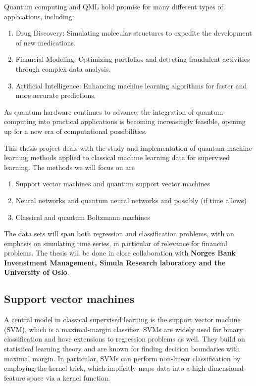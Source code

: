 \documentclass[%
oneside,                 %
final,                   %
10pt]{article}
\begin{document}
Quantum computing and QML hold promise for many different types of  applications, including:

\begin{enumerate}
\item Drug Discovery: Simulating molecular structures to expedite the development of new medications.

\item Financial Modeling: Optimizing portfolios and detecting fraudulent activities through complex data analysis.

\item Artificial Intelligence: Enhancing machine learning algorithms for faster and more accurate predictions. 
\end{enumerate}

As quantum hardware continues to advance, the integration of quantum
computing into practical applications is becoming increasingly
feasible, opening up for a new era of computational possibilities.

This thesis project deals with the study and implementation of quantum
machine learning methods applied to classical machine learning data
for supervised learning.  The methods we will focus on are

\begin{enumerate}
\item Support vector machines and quantum support vector machines

\item Neural networks and quantum neural networks and possibly (if time allows)

\item Classical and quantum Boltzmann machines
\end{enumerate}


The data sets will span both regression and classification problems,
with an emphasis on simulating time series, in particular of relevance
for financial problems. The thesis will be done in close collaboration
with \textbf{Norges Bank Invenstment Management, Simula Research
  laboratory and the University of Oslo}.

\subsection*{Support vector machines}

A central model in classical supervised learning is the support vector
machine (SVM), which is a maximal-margin classifier.  SVMs are widely
used for binary classification and have extensions to regression
problems as well.  They build on statistical learning theory and are
known for finding decision boundaries with maximal margin.  In
particular, SVMs can perform non-linear classification by employing
the kernel trick, which implicitly maps data into a high-dimensional
feature space via a kernel function.
\end{document}

